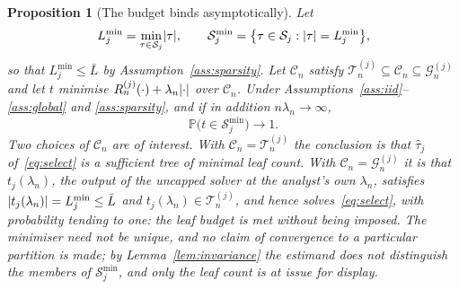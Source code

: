 \documentclass[11pt]{article}
\theoremstyle{plain}
\newtheorem{proposition}[theorem]{Proposition}
\theoremstyle{definition}
\theoremstyle{remark}
\newcommand{\PP}{\mathbb{P}}
\newcommand{\cT}{\mathcal{T}}
\newcommand{\cS}{\mathcal{S}}
\newcommand{\cG}{\mathcal{G}}
\newcommand{\that}{\widehat{\tau}}
\DeclarePairedDelimiter{\card}{\lvert}{\rvert}
\begin{document}
\begin{proposition}[The budget binds asymptotically]\label{prop:parsimony}
Let
\[
  L^{\min}_j=\min_{\tau\in\cS_j}\card\tau,
  \qquad
  \cS^{\min}_j=\bigl\{\tau\in\cS_j:\card\tau=L^{\min}_j\bigr\},
\]
so that $L^{\min}_j\le\bar L$ by Assumption~\ref{ass:sparsity}. Let
$\mathcal{C}_n$ satisfy $\cT^{(j)}_n\subseteq\mathcal{C}_n\subseteq\cG^{(j)}_n$
and let $t$ minimise $R^{(j)}_n(\cdot)+\lambda_n\card{\cdot}$ over
$\mathcal{C}_n$. Under Assumptions~\ref{ass:iid}--\ref{ass:global} and
\ref{ass:sparsity}, and if in addition $n\lambda_n\to\infty$,
\[
  \PP\bigl(t\in\cS^{\min}_j\bigr)\longrightarrow1 .
\]
Two choices of $\mathcal{C}_n$ are of interest. With $\mathcal{C}_n=\cT^{(j)}_n$
the conclusion is that $\that_j$ of~\eqref{eq:select} is a sufficient tree of
minimal leaf count. With $\mathcal{C}_n=\cG^{(j)}_n$ it is that $t_j(\lambda_n)$,
the output of the uncapped solver at the analyst's own $\lambda_n$, satisfies
$\card{t_j(\lambda_n)}=L^{\min}_j\le\bar L$ and $t_j(\lambda_n)\in\cT^{(j)}_n$,
and hence solves~\eqref{eq:select}, with probability tending to one: the leaf
budget is met without being imposed. The minimiser need not be unique, and no
claim of convergence to a particular partition is made; by
Lemma~\ref{lem:invariance} the estimand does not distinguish the members of
$\cS^{\min}_j$, and only the leaf count is at issue for display.
\end{proposition}
\end{document}
